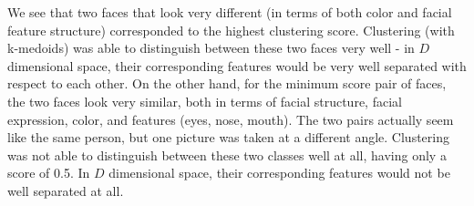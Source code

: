 \documentclass[11pt]{article}
\begin{document}
{\newline{}

We see that two faces that look very different (in terms of both color and facial feature structure) corresponded to the highest clustering score. Clustering (with k-medoids) was able to distinguish between these two faces very well - in $D$ dimensional space, their corresponding features would be very well separated with respect to each other. On the other hand, for the minimum score pair of faces, the two faces look very similar, both in terms of facial structure, facial expression, color, and features (eyes, nose, mouth). The two pairs actually seem like the same person, but one picture was taken at a different angle. Clustering was not able to distinguish between these two classes well at all, having only a score of 0.5. In $D$ dimensional space, their corresponding features would not be well separated at all. 


}
\end{document}
